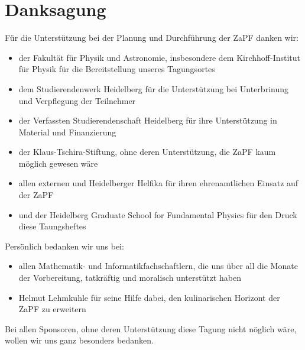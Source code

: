 
\section{Danksagung}
Für die Unterstützung bei der Planung und Durchführung der ZaPF danken wir:
\begin{itemize}
\item der Fakultät für Physik und Astronomie, insbesondere dem Kirchhoff-Institut für Physik für die Bereitstellung unseres Tagungsortes
\item dem Studierendenwerk Heidelberg für die Unterstützung bei Unterbrinung und Verpflegung der Teilnehmer
\item der Verfassten Studierendenschaft Heidelberg für ihre Unterstützung in Material und Finanzierung
\item der Klaus-Tschira-Stiftung, ohne deren Unterstützung, die ZaPF kaum möglich gewesen wäre
\item allen externen und Heidelberger Helfika für ihren ehrenamtlichen Einsatz auf der ZaPF
\item und der Heidelberg Graduate School for Fundamental Physics für den Druck diese Taungsheftes
\end{itemize}
 Persönlich bedanken wir uns bei:
 \begin{itemize}
 \item allen Mathematik- und Informatikfachschaftlern, die uns über all die Monate der Vorbereitung, tatkräftig und moralisch unterstützt haben
 \item Helmut Lehmkuhle für seine Hilfe dabei, den kulinarischen Horizont der ZaPF zu erweitern
 \end{itemize}
 Bei allen Sponsoren, ohne deren Unterstützung diese Tagung nicht nöglich wäre, wollen wir uns ganz besonders bedanken.
 

